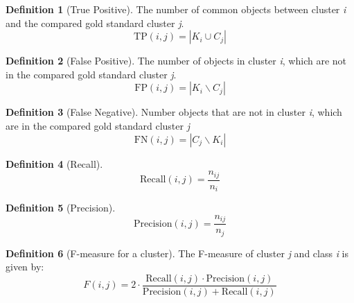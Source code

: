 \documentclass[a4paper,10pt]{article}
\theoremstyle{plain}
\theoremstyle{definition}
\newtheorem{defn}{Definition}
\begin{document}
\begin{defn}[True Positive]\label{}
	The number of common objects between cluster \textit{i} and the compared gold standard cluster \textit{j}.
	\begin{equation}
		\text{TP}(i,j) = |K_i \cup C_j|
	\end{equation}
\end{defn}

\begin{defn}[False Positive]\label{}
	The number of objects in cluster \textit{i}, which are not in the compared gold standard cluster \textit{j}.
	\begin{equation}
		\text{FP}(i,j) = |K_i \backslash C_j|
	\end{equation}
\end{defn}

\begin{defn}[False Negative]\label{}
	Number objects that are not in cluster \textit{i}, which are in the compared gold standard cluster \textit{j}
	\begin{equation}
		\text{FN}(i,j) = |C_j \backslash K_i|
	\end{equation}
\end{defn}

\begin{defn}[Recall]\label{}
	\begin{equation}
		\text{Recall}(i,j) = \frac{n_{ij}}{n_i}
	\end{equation}
\end{defn}

\begin{defn}[Precision]\label{}
	\begin{equation}
		\text{Precision}(i,j) = \frac{n_{ij}}{n_j}
	\end{equation}
\end{defn}

\begin{defn}[F-measure for a cluster]\label{}
	The F-measure of cluster \textit{j} and class \textit{i} is given by:
	\begin{equation}
		F(i,j) = 2 \cdot \frac{\text{Recall}(i,j) \cdot \text{Precision}(i,j)}{\text{Precision}(i,j) + \text{Recall}(i,j)}
	\end{equation}
\end{defn}
\end{document}
